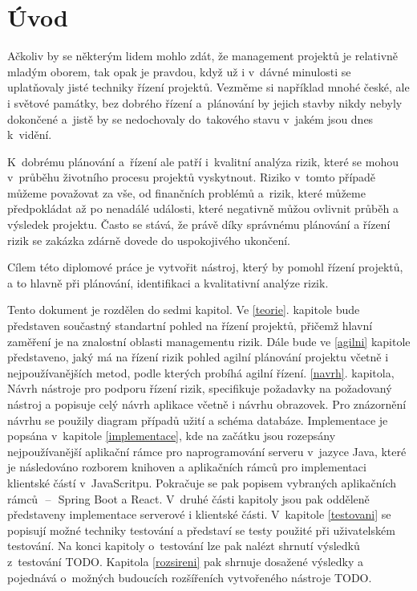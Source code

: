 
\chapter{Úvod}
Ačkoliv by se některým lidem mohlo zdát, že management projektů je relativně mladým oborem, tak opak je pravdou, když už i v~dávné minulosti se uplatňovaly jisté techniky řízení projektů. Vezměme si například mnohé české, ale i světové památky, bez dobrého řízení a~plánování by jejich stavby nikdy nebyly dokončené a~jistě by se nedochovaly do~takového stavu v~jakém jsou dnes k~vidění.

K~dobrému plánování a~řízení ale patří i~kvalitní analýza rizik, které se mohou v~průběhu životního procesu projektů vyskytnout. Riziko v~tomto případě můžeme považovat za vše, od finančních problémů a~rizik, které můžeme předpokládat až po nenadálé události, které negativně můžou ovlivnit průběh a výsledek projektu. Často se stává, že právě díky správnému plánování a řízení rizik se zakázka zdárně dovede do uspokojivého ukončení.

Cílem této diplomové práce je vytvořit nástroj, který by pomohl řízení projektů, a to hlavně při plánování, identifikaci a kvalitativní analýze rizik. 

Tento dokument je rozdělen do sedmi kapitol. Ve \ref{teorie}. kapitole bude představen součastný standartní pohled na řízení projektů, přičemž hlavní zaměření je na znalostní oblasti managementu rizik. Dále bude ve \ref{agilni} kapitole představeno, jaký má na řízení rizik pohled agilní plánování projektu včetně i nejpoužívanějších metod, podle kterých probíhá agilní řízení. \ref{navrh}. kapitola, Návrh nástroje pro podporu řízení rizik, specifikuje požadavky na požadovaný nástroj a popisuje celý návrh aplikace včetně i návrhu obrazovek. Pro znázornění návrhu se použily diagram případů užití a schéma databáze. Implementace je popsána v~kapitole \ref{implementace}, kde na začátku jsou rozepsány nejpoužívanější aplikační rámce pro naprogramování serveru v~jazyce Java, které je následováno rozborem knihoven a aplikačních rámců pro implementaci klientské částí v~JavaScritpu. Pokračuje se pak popisem vybraných aplikačních rámců~\,--\,~Spring Boot a React. V~druhé části kapitoly jsou pak odděleně představeny implementace serverové i klientské části. V~kapitole \ref{testovani} se popisují možné techniky testování a představí se testy použité při uživatelském testování. Na konci kapitoly o~testování lze pak nalézt shrnutí výsledků z~testování TODO. Kapitola \ref{rozsireni} pak shrnuje dosažené výsledky a pojednává o~možných budoucích  rozšířeních vytvořeného nástroje TODO.

